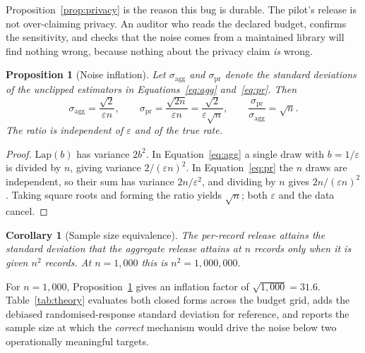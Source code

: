 \documentclass[journal]{IEEEtran}
\newtheorem{proposition}[theorem]{Proposition}
\newtheorem{corollary}[theorem]{Corollary}
\theoremstyle{definition}
\newcommand{\Nrec}{1{,}000}
\newcommand{\Inflation}{31.6}
\newcommand{\Nequiv}{1{,}000{,}000}
\begin{document}
Proposition~\ref{prop:privacy} is the reason this bug is durable. The pilot's
release is not over-claiming privacy. An auditor who reads the declared budget,
confirms the sensitivity, and checks that the noise comes from a maintained
library will find nothing wrong, because nothing about the privacy claim
\emph{is} wrong.

\begin{proposition}[Noise inflation]
\label{prop:inflation}
Let $\sigma_{\mathrm{agg}}$ and $\sigma_{\mathrm{pr}}$ denote the standard
deviations of the unclipped estimators in Equations~\eqref{eq:agg}
and~\eqref{eq:pr}. Then
\[
\sigma_{\mathrm{agg}} = \frac{\sqrt{2}}{\varepsilon n},
\qquad
\sigma_{\mathrm{pr}} = \frac{\sqrt{2n}}{\varepsilon n} = \frac{\sqrt{2}}{\varepsilon\sqrt{n}},
\qquad
\frac{\sigma_{\mathrm{pr}}}{\sigma_{\mathrm{agg}}} = \sqrt{n}.
\]
The ratio is independent of $\varepsilon$ and of the true rate.
\end{proposition}

\begin{proof}
$\mathrm{Lap}(b)$ has variance $2b^2$. In Equation~\eqref{eq:agg} a single draw
with $b = 1/\varepsilon$ is divided by $n$, giving variance
$2/(\varepsilon n)^2$. In Equation~\eqref{eq:pr} the $n$ draws are independent,
so their sum has variance $2n/\varepsilon^2$, and dividing by $n$ gives
$2n/(\varepsilon n)^2$. Taking square roots and forming the ratio yields
$\sqrt{n}$; both $\varepsilon$ and the data cancel.
\end{proof}

\begin{corollary}[Sample size equivalence]
\label{cor:nequiv}
The per-record release attains the standard deviation that the aggregate release
attains at $n$ records only when it is given $n^2$ records. At $n = \Nrec{}$
this is $n^2 = \Nequiv{}$.
\end{corollary}

For $n = \Nrec{}$, Proposition~\ref{prop:inflation} gives an inflation factor of
$\sqrt{\Nrec{}} = \Inflation$. Table~\ref{tab:theory} evaluates both closed forms
across the budget grid, adds the debiased randomised-response standard deviation
for reference, and reports the sample size at which the \emph{correct} mechanism
would drive the noise below two operationally meaningful targets.
\end{document}
